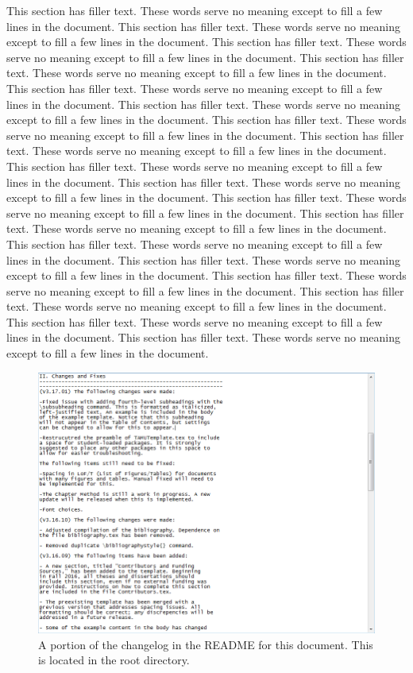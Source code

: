 This section has filler text. These words serve no meaning except to fill a few lines in the document. This section has filler text. These words serve no meaning except to fill a few lines in the document. This section has filler text. These words serve no meaning except to fill a few lines in the document. This section has filler text. These words serve no meaning except to fill a few lines in the document. This section has filler text. These words serve no meaning except to fill a few lines in the document. This section has filler text. These words serve no meaning except to fill a few lines in the document. This section has filler text. These words serve no meaning except to fill a few lines in the document. This section has filler text. These words serve no meaning except to fill a few lines in the document. This section has filler text. These words serve no meaning except to fill a few lines in the document. This section has filler text. These words serve no meaning except to fill a few lines in the document. This section has filler text. These words serve no meaning except to fill a few lines in the document. This section has filler text. These words serve no meaning except to fill a few lines in the document. This section has filler text. These words serve no meaning except to fill a few lines in the document. This section has filler text. These words serve no meaning except to fill a few lines in the document. This section has filler text. These words serve no meaning except to fill a few lines in the document. This section has filler text. These words serve no meaning except to fill a few lines in the document. This section has filler text. These words serve no meaning except to fill a few lines in the document. This section has filler text. These words serve no meaning except to fill a few lines in the document.

\begin{figure}[!h]
	\centering
	\includegraphics[width = 4.825in]{images/Changelog.png}
	\caption{A portion of the changelog in the README for this document. This is located in the root directory.}
\end{figure}

